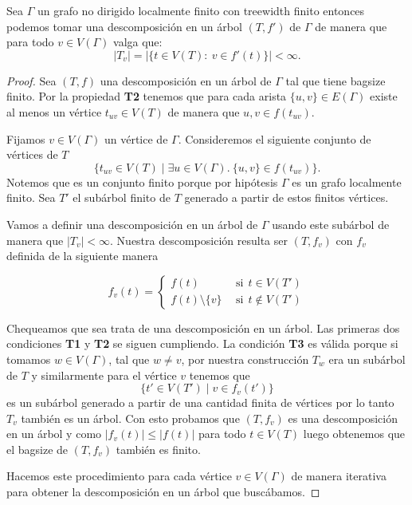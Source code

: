 \documentclass[tesis.tex]{subfiles}
\begin{document}
\begin{prop}\label{prop_tw_finitos_bolsones}
	Sea $\Gamma$ un grafo no dirigido localmente finito con treewidth finito entonces podemos tomar una descomposición en un árbol $(T,f')$ de $\Gamma$ de manera que para todo $v \in V(\Gamma)$ valga que:
	\[
	|T_{v}| = | \{  t \in V(T) : \ v \in f'(t)  \} | < \infty.
	\]
\end{prop}
\begin{proof}
	Sea $(T,f)$ una descomposición en un árbol de $\Gamma$ tal que tiene bagsize finito.
	Por la propiedad \textbf{T2} tenemos que para cada arista 
	$\{u,v\} \in E(\Gamma)$ existe al menos un vértice $t_{uv} \in V(T)$ de manera que $u,v \in f(t_{uv})$.
	
	Fijamos $v \in V(\Gamma)$ un vértice  de $\Gamma$.
	Consideremos el siguiente conjunto de vértices de $T$
	\[
		\{  t_{uv} \in V(T) \mid \exists u \in V(\Gamma). \ \{ u,v \} \in f(t_{uv})  \}.
	\]
	Notemos que es un conjunto finito porque por hipótesis $\Gamma$ es un grafo localmente finito.
	Sea $T'$ el subárbol finito de $T$ generado a partir de estos finitos vértices.
	
	Vamos a definir una descomposición en un árbol de $\Gamma$ usando este subárbol de manera que $|T_{v}| < \infty$.
	Nuestra descomposición resulta ser $(T,f_{v})$ con $f_{v}$ definida de la siguiente manera
	
	\[
	f_{v}(t) = 
	\begin{cases}
		f(t)  \ \  &\text{si} \ \  t \in V(T') \\
		f(t) \setminus \{  v \} \ \  &\text{si} \ \  t \notin V(T')
	\end{cases}
	\]
	
	
	Chequeamos que sea trata de una descomposición en un árbol.
	Las primeras dos condiciones \textbf{T1} y \textbf{T2} se siguen cumpliendo.
	La condición \textbf{T3} es válida porque si tomamos $w \in V(\Gamma)$, tal que $w \neq v$, por nuestra construcción $T_{w}$ era un subárbol de $T$ y similarmente para el vértice $v$ tenemos que 
	\[
		\{ t' \in V(T') \mid v \in f_{v}(t') \}
	\]	
	es un subárbol generado a partir de una cantidad finita de vértices por lo tanto $T_{v}$ también es un árbol.
	Con esto probamos que $(T,f_{v})$ es una descomposición en un árbol y como $|f_{v}(t)| \le |f(t)|$ para todo $t \in V(T)$ luego obtenemos que el bagsize de $(T,f_{v})$ también es finito.
	
	Hacemos este procedimiento para cada vértice $v \in V(\Gamma)$ de manera iterativa para obtener la descomposición en un árbol que buscábamos.
	
\end{proof}
\end{document}
